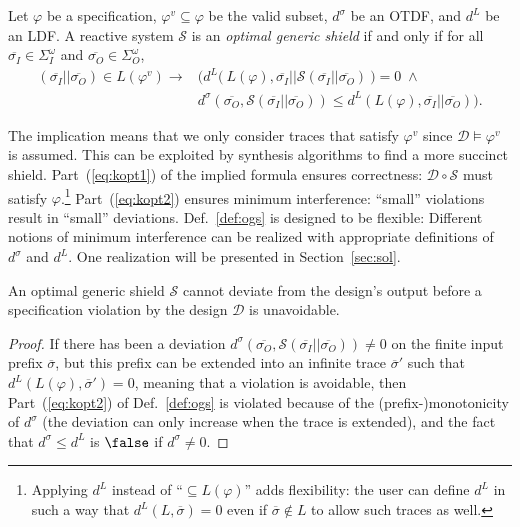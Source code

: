\documentclass{llncs}
\newcommand{\design}{\mathcal{D}}
\newcommand{\shield}{\mathcal{S}}
\newcommand{\dinalph}{\Sigma_I}
\newcommand{\dintrace}{{\overline{\sigma_I}}}
\newcommand{\doutalph}{\Sigma_O}
\newcommand{\douttrace}{{\overline{\sigma_O}}}
\newcommand{\dletter}{\sigma}
\newcommand{\dtrace}{\overline{\dletter}}
\newcommand{\lang}{L}
\newcommand{\spec}{\varphi}
\newcommand{\specv}{\varphi^v}
\newcommand{\distt}{d^\sigma}
\newcommand{\distl}{d^L}
\newcommand{\kin}{\!\in\!}
\newcommand{\comp}{\circ}
\begin{document}
\begin{definition}
\label{def:ogs}
Let $\spec$ be a specification, $\specv \subseteq \spec$ be the valid 
subset, $\distt$ be an OTDF, and $\distl$ be an LDF.  A reactive system 
$\shield$ is an \emph{optimal generic shield} if and only if for all 
$\dintrace \kin \dinalph^\omega$ and $\douttrace \kin 
\doutalph^\omega$, 
\begin{align}
(\dintrace || \douttrace) \kin \lang(\specv) \rightarrow & 
\bigl(
  \distl\bigl(~ \lang(\spec), 
              \dintrace || \shield(\dintrace || \douttrace) 
       ~\bigr) = 0
\;\wedge  \label{eq:kopt1} 
\\ &
 \distt(\douttrace, \shield(\dintrace || \douttrace)) \leq 
      \distl(\lang(\spec), \dintrace || \douttrace)
\bigr)
. \label{eq:kopt2}
\end{align}
\end{definition}


\noindent
The implication means that we only consider traces that satisfy $\specv$ 
since $\design \models \specv$ is assumed.   This can be exploited by 
synthesis algorithms to find a more succinct shield. 
Part~(\ref{eq:kopt1}) of the implied formula ensures correctness: 
$\design \comp \shield$ must satisfy $\spec$.\footnote{Applying $\distl$ 
instead of ``$\subseteq \lang(\spec)$'' adds flexibility: the user can 
define $\distl$ in such a way that $\distl(\lang, \dtrace) = 0$ even if 
$\dtrace\not\in\lang$ to allow such traces as well.} 
Part~(\ref{eq:kopt2}) ensures minimum interference: ``small'' violations 
result in ``small'' deviations. Def.~\ref{def:ogs} is designed to be 
flexible: Different notions of minimum interference can be realized with 
appropriate definitions of $\distt$ and $\distl$.  One realization will 
be presented in Section~\ref{sec:sol}.


\begin{proposition}
An optimal generic shield $\shield$ cannot deviate from the design's 
output before a specification violation by the design $\design$ is 
unavoidable.
\end{proposition}
\begin{proof}
If there has been a deviation $\distt(\douttrace, \shield(\dintrace || 
\douttrace)) \neq 0$ on the finite input prefix $\dtrace$, but this 
prefix can be extended into an infinite trace $\dtrace'$ such that 
$\distl(\lang(\spec), \dtrace') = 0$, meaning that a violation is 
avoidable, then Part~(\ref{eq:kopt2}) of Def.~\ref{def:ogs} is violated 
because of the (prefix-)monotonicity of $\distt$ (the deviation can only 
increase when the trace is extended), and the fact that $\distt \leq 
\distl$ is $\false$ if $\distt\neq 0$.
\end{proof}
\end{document}

